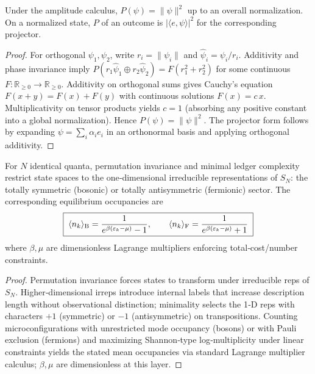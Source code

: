 \documentclass[11pt]{article}
\begin{document}
\begin{theorem}
\label{thm:born}
Under the amplitude calculus, \(P(\psi)=\|\psi\|^{2}\) up to an overall normalization. On a normalized state, \(P\) of an outcome is \(|\langle e,\psi\rangle|^{2}\) for the corresponding projector.
\end{theorem}

\begin{proof}
For orthogonal \(\psi_1,\psi_2\), write \(r_i=\|\psi_i\|\) and \(\hat\psi_i=\psi_i/r_i\). Additivity and phase invariance imply \(P(r_1\hat\psi_1\oplus r_2\hat\psi_2)=F(r_1^{2}+r_2^{2})\) for some continuous \(F:\mathbb R_{\ge0}\to\mathbb R_{\ge0}\). Additivity on orthogonal sums gives Cauchy’s equation \(F(x+y)=F(x)+F(y)\) with continuous solutions \(F(x)=c\,x\). Multiplicativity on tensor products yields \(c=1\) (absorbing any positive constant into a global normalization). Hence \(P(\psi)=\|\psi\|^{2}\). The projector form follows by expanding \(\psi=\sum_i \alpha_i e_i\) in an orthonormal basis and applying orthogonal additivity.
\end{proof}

\begin{theorem}
\label{thm:be-fd}
For \(N\) identical quanta, permutation invariance and minimal ledger complexity restrict state spaces to the one‑dimensional irreducible representations of \(S_{N}\): the totally symmetric (bosonic) or totally antisymmetric (fermionic) sector. The corresponding equilibrium occupancies are
\[
\boxed{\;\langle n_k\rangle_{\rm B}=\frac{1}{e^{\beta(\varepsilon_k-\mu)}-1},\qquad
       \langle n_k\rangle_{\rm F}=\frac{1}{e^{\beta(\varepsilon_k-\mu)}+1}\;}
\]
where \(\beta,\mu\) are dimensionless Lagrange multipliers enforcing total‑cost/number constraints.
\end{theorem}

\begin{proof}
Permutation invariance forces states to transform under irreducible reps of \(S_N\). Higher‑dimensional irreps introduce internal labels that increase description length without observational distinction; minimality selects the 1‑D reps with characters \(+1\) (symmetric) or \(-1\) (antisymmetric) on transpositions. Counting microconfigurations with unrestricted mode occupancy (bosons) or with Pauli exclusion (fermions) and maximizing Shannon‑type log‑multiplicity under linear constraints yields the stated mean occupancies via standard Lagrange multiplier calculus; \(\beta,\mu\) are dimensionless at this layer.
\end{proof}
\end{document}
